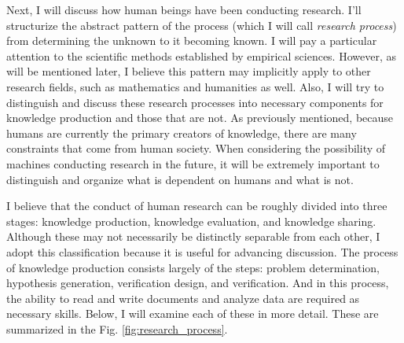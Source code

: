 \documentclass{book}
\begin{document}


Next, I will discuss how human beings have been conducting research. I'll structurize the abstract pattern of the process (which I will call\textit{ research process}) from determining the unknown to it becoming known. I will pay a particular attention to the scientific methods established by empirical sciences. However, as will be mentioned later, I believe this pattern may implicitly apply to other research fields, such as mathematics and humanities as well. Also, I will try to distinguish and discuss these research processes into necessary components for knowledge production and those that are not. As previously mentioned, because humans are currently the primary creators of knowledge, there are many constraints that come from human society. When considering the possibility of machines conducting research in the future, it will be extremely important to distinguish and organize what is dependent on humans and what is not.

I believe that the conduct of human research can be roughly divided into three stages: knowledge production, knowledge evaluation, and knowledge sharing. Although these may not necessarily be distinctly separable from each other, I adopt this classification because it is useful for advancing discussion. The process of knowledge production consists largely of the steps: problem determination, hypothesis generation, verification design, and verification. And in this process, the ability to read and write documents and analyze data are required as necessary skills. Below, I will examine each of these in more detail. These are summarized in the Fig. \ref{fig:research_process}.
\end{document}

